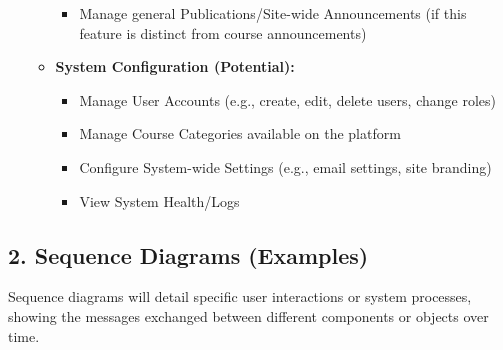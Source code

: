 \begin{itemize}
\begin{itemize}
\begin{itemize}
            \item Manage general Publications/Site-wide Announcements (if this feature is distinct from course announcements)
        \end{itemize}
        \item \textbf{System Configuration (Potential):}
        \begin{itemize}
            \item Manage User Accounts (e.g., create, edit, delete users, change roles)
            \item Manage Course Categories available on the platform
            \item Configure System-wide Settings (e.g., email settings, site branding)
            \item View System Health/Logs
        \end{itemize}
    \end{itemize}
\end{itemize}

\subsection*{2. Sequence Diagrams (Examples)}

Sequence diagrams will detail specific user interactions or system processes, showing the messages exchanged between different components or objects over time.

